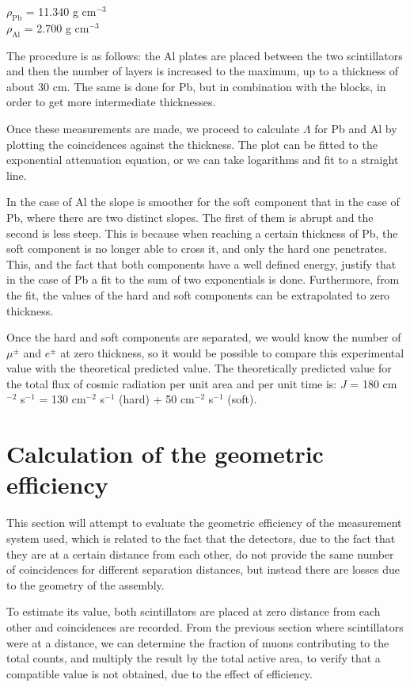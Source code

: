 \bc$\rho_\text{Pb}$ = 11.340 g cm$^{-3}$\\[12pt]
  $\rho_\text{Al}$  = 2.700 g cm$^{-3}$\ec

The procedure is as follows: the Al plates are placed between the two scintillators and then the number of layers is increased to the maximum, up to a thickness of about 30 cm. The same is done for Pb, but in combination with the blocks, in order to get more intermediate thicknesses.

Once these measurements are made, we proceed to calculate $\Lambda$ for Pb and Al by plotting the coincidences against the thickness. The plot can be fitted to the exponential attenuation equation, or we can take logarithms and fit to a straight line.

In the case of Al the slope is smoother for the soft component that in the case of Pb, where there are two distinct slopes. The first of them is abrupt and the second is less steep. This is because when reaching a certain thickness of Pb, the soft component is no longer able to cross it, and only the hard one penetrates. This, and the fact that both components have a well defined energy, justify that in the case of Pb a fit to the sum of two exponentials is done. Furthermore, from the fit, the values of the hard and soft components can be extrapolated to zero thickness.

Once the hard and soft components are separated, we would know the number of $\mu^\pm$ and $e^\pm$ at zero thickness, so it would be possible to compare this experimental value with the theoretical predicted value. The theoretically predicted value for the total flux of cosmic radiation per unit area and per unit time is: $J$ = 180 cm$^{-2}$ s$^{-1}$ = 130 cm$^{-2}$ s$^{-1}$ (hard) + 50 cm$^{-2}$ s$^{-1}$ (soft).



\section{Calculation of the geometric efficiency}


This section will attempt to evaluate the geometric efficiency of the measurement system used, which is related to the fact that the detectors, due to the fact that  they are at a certain distance from each other, do not provide the same number of coincidences for different separation distances, but instead there are losses due to the geometry of the assembly.

To estimate its value, both scintillators are placed at zero distance from each other and coincidences are recorded. From the previous section where scintillators were at a distance, we can determine the fraction of muons contributing to the total counts, and multiply the result by the total active area, to verify that a compatible value is not obtained, due to the effect of efficiency.

